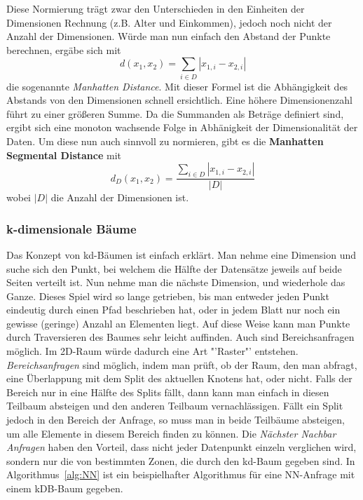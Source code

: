 Diese Normierung trägt zwar den Unterschieden in den Einheiten der Dimensionen
Rechnung (z.B. Alter und Einkommen), jedoch noch nicht der Anzahl der Dimensionen.
Würde man nun einfach den Abstand der Punkte berechnen, ergäbe sich mit
\[
	d(x_1, x_2) = \sum\limits_{i\in D} |x_{1,i} - x_{2,i}|
\]
die sogenannte \textit{Manhatten Distance}. Mit dieser Formel ist die Abhängigkeit
des Abstands von den Dimensionen schnell ersichtlich.
Eine höhere Dimensionenzahl führt zu einer größeren Summe. Da die Summanden als
Beträge definiert sind, ergibt sich eine monoton wachsende Folge in Abhänigkeit der
Dimensionalität der Daten. Um diese nun auch sinnvoll zu normieren, gibt
es die \textbf{Manhatten Segmental Distance} mit
\[
	d_D(x_1, x_2) = \frac{\sum\limits_{i\in D} |x_{1,i} - x_{2,i}|}{|D|}
\]
wobei \(|D|\) die Anzahl der Dimensionen ist.

\subsubsection{k-dimensionale Bäume}
Das Konzept von kd-Bäumen ist einfach erklärt. Man nehme eine Dimension und suche
sich den Punkt, bei welchem die Hälfte der Datensätze jeweils auf beide Seiten
verteilt ist. Nun nehme man die nächste Dimension, und wiederhole das Ganze. Dieses
Spiel wird so lange getrieben, bis man entweder jeden Punkt eindeutig durch
einen Pfad beschrieben hat, oder in jedem Blatt nur noch ein gewisse (geringe) 
Anzahl an Elementen liegt. Auf diese Weise kann man Punkte durch Traversieren
des Baumes sehr leicht auffinden. Auch sind Bereichsanfragen möglich. 
Im 2D-Raum würde dadurch eine Art "'Raster"' entstehen.
\textit{Bereichsanfragen} sind möglich, indem man prüft, ob der Raum, den man abfragt,
eine Überlappung mit dem Split des aktuellen Knotens hat, oder nicht. Falls
der Bereich nur in eine Hälfte des Splits fällt, dann kann man einfach in diesen Teilbaum
absteigen und den anderen Teilbaum vernachlässigen. Fällt ein Split jedoch
in den Bereich der Anfrage, so muss man in beide Teilbäume absteigen, um alle
Elemente in diesem Bereich finden zu können.
Die \textit{Nächster Nachbar Anfragen} haben den Vorteil, dass nicht jeder Datenpunkt
einzeln verglichen wird, sondern nur die von bestimmten Zonen, die durch den
kd-Baum gegeben sind. In Algorithmus~\ref{alg:NN} ist ein beispielhafter Algorithmus
für eine NN-Anfrage mit einem kDB-Baum gegeben.

